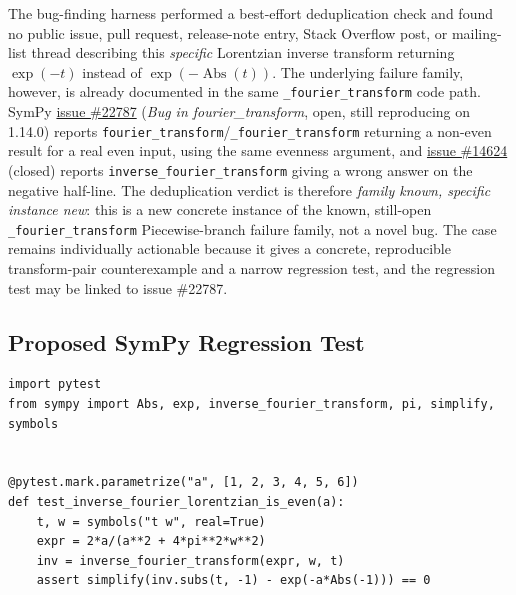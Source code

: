 \documentclass[11pt]{article}
\begin{document}
The bug-finding harness performed a best-effort deduplication check and found
no public issue, pull request, release-note entry, Stack Overflow post, or
mailing-list thread describing this \emph{specific} Lorentzian inverse transform
returning \(\exp(-t)\) instead of \(\exp(-\operatorname{Abs}(t))\).  The
underlying failure family, however, is already documented in the same
\texttt{\_fourier\_transform} code path.  SymPy
\href{https://github.com/sympy/sympy/issues/22787}{issue \#22787}
(\emph{Bug in fourier\_transform}, open, still reproducing on 1.14.0) reports
\texttt{fourier\_transform}/\texttt{\_fourier\_transform} returning a non-even
result for a real even input, using the same evenness argument, and
\href{https://github.com/sympy/sympy/issues/14624}{issue \#14624} (closed)
reports \texttt{inverse\_fourier\_transform} giving a wrong answer on the
negative half-line.  The deduplication verdict is therefore
\emph{family known, specific instance new}: this is a new concrete instance of
the known, still-open \texttt{\_fourier\_transform} Piecewise-branch failure
family, not a novel bug.  The case remains individually actionable because it
gives a concrete, reproducible transform-pair counterexample and a narrow
regression test, and the regression test may be linked to issue \#22787.

\subsection{Proposed SymPy Regression Test}

\medskip

\begin{lstlisting}[style=bugpython]
import pytest
from sympy import Abs, exp, inverse_fourier_transform, pi, simplify, symbols


@pytest.mark.parametrize("a", [1, 2, 3, 4, 5, 6])
def test_inverse_fourier_lorentzian_is_even(a):
    t, w = symbols("t w", real=True)
    expr = 2*a/(a**2 + 4*pi**2*w**2)
    inv = inverse_fourier_transform(expr, w, t)
    assert simplify(inv.subs(t, -1) - exp(-a*Abs(-1))) == 0
\end{lstlisting}
\end{document}
